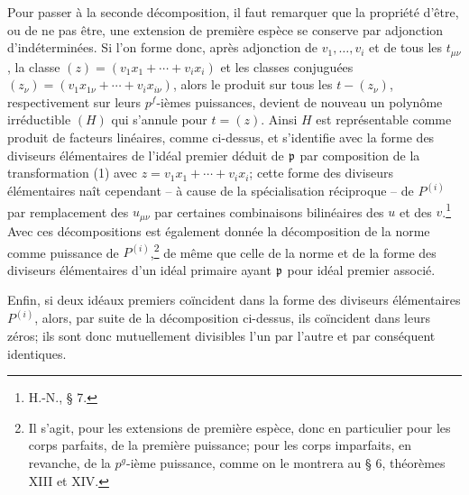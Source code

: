 Pour passer à la seconde décomposition, il faut remarquer que la propriété d'être, ou de ne pas être, une extension de première espèce se conserve par adjonction d'indéterminées. Si l'on forme donc, après adjonction de $v_1,\ldots,v_i$ et de tous les $t_{\mu\nu}$, la classe $(z)=(v_1x_1+\cdots+v_ix_i)$ et les classes conjuguées $(z_\nu)=(v_1x_{1\nu}+\cdots+v_ix_{i\nu})$, alors le produit sur tous les $t-(z_\nu)$, respectivement sur leurs $p^f$-ièmes puissances, devient de nouveau un polynôme irréductible $(H)$ qui s'annule pour $t=(z)$. Ainsi $H$ est représentable comme produit de facteurs linéaires, comme ci-dessus, et s'identifie avec la forme des diviseurs élémentaires de l'idéal premier déduit de $\mathfrak p$ par composition de la transformation (1) avec $z=v_1x_1+\cdots+v_ix_i$; cette forme des diviseurs élémentaires naît cependant -- à cause de la spécialisation réciproque -- de $P^{(i)}$ par remplacement des $u_{\mu\nu}$ par certaines combinaisons bilinéaires des $u$ et des $v$.\footnote{H.-N., \S{} 7.} Avec ces décompositions est également donnée la décomposition de la norme comme puissance de $P^{(i)}$,\footnote{Il s'agit, pour les extensions de première espèce, donc en particulier pour les corps parfaits, de la première puissance; pour les corps imparfaits, en revanche, de la $p^g$-ième puissance, comme on le montrera au \S{} 6, théorèmes XIII et XIV.} de même que celle de la norme et de la forme des diviseurs élémentaires d'un idéal primaire ayant $\mathfrak p$ pour idéal premier associé.

Enfin, si deux idéaux premiers coïncident dans la forme des diviseurs élémentaires $P^{(i)}$, alors, par suite de la décomposition ci-dessus, ils coïncident dans leurs zéros; ils sont donc mutuellement divisibles l'un par l'autre et par conséquent identiques.
